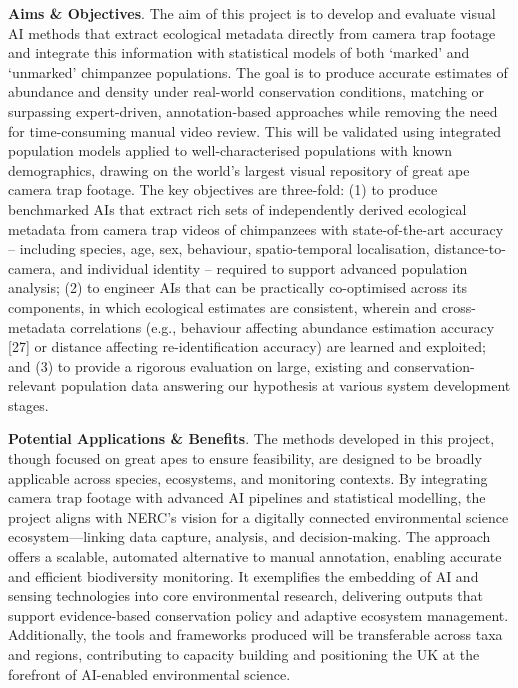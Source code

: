 \textbf{Aims \& Objectives}. The aim of this project is to develop and evaluate visual AI methods that extract ecological metadata directly from camera trap footage and integrate this information with statistical models of both ‘marked’ and ‘unmarked’ chimpanzee populations. The goal is to produce accurate estimates of abundance and density under real-world conservation conditions, matching or surpassing expert-driven, annotation-based approaches while removing the need for time-consuming manual video review. This will be validated using integrated population models applied to well-characterised populations with known demographics, drawing on the world’s largest visual repository of great ape camera trap footage. The key objectives are three-fold: (1) to produce benchmarked AIs that extract rich sets of independently derived ecological metadata from camera trap videos of chimpanzees with state-of-the-art accuracy – including species, age, sex, behaviour, spatio-temporal localisation, distance-to-camera, and individual identity – required to support advanced population analysis; (2) to engineer AIs that can be practically co-optimised across its components, in which ecological estimates are consistent, wherein and cross-metadata correlations (e.g., behaviour affecting abundance estimation accuracy [27] or distance affecting re-identification accuracy) are learned and exploited; and (3) to provide a rigorous evaluation on large, existing and conservation-relevant population data answering our hypothesis at various system development stages.

\textbf{Potential Applications \& Benefits}. The methods developed in this project, though focused on great apes to ensure feasibility, are designed to be broadly applicable across species, ecosystems, and monitoring contexts. By integrating camera trap footage with advanced AI pipelines and statistical modelling, the project aligns with NERC’s vision for a digitally connected environmental science ecosystem—linking data capture, analysis, and decision-making. The approach offers a scalable, automated alternative to manual annotation, enabling accurate and efficient biodiversity monitoring. It exemplifies the embedding of AI and sensing technologies into core environmental research, delivering outputs that support evidence-based conservation policy and adaptive ecosystem management. Additionally, the tools and frameworks produced will be transferable across taxa and regions, contributing to capacity building and positioning the UK at the forefront of AI-enabled environmental science.

